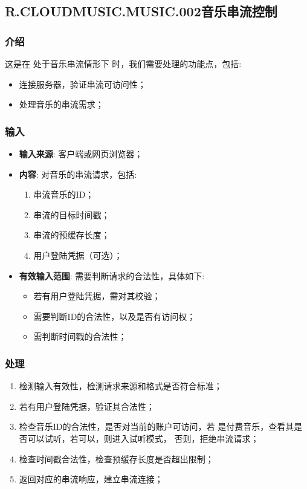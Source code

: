 \begin{enumerate}
\subsection{R.CLOUDMUSIC.MUSIC.002音乐串流控制}
\subsubsection{介绍}
	这是在 处于音乐串流情形下 时，我们需要处理的功能点，包括: 
	\begin{itemize}
		\item 连接服务器，验证串流可访问性；
		\item 处理音乐的串流需求；
	\end{itemize}
\subsubsection{输入}
	\begin{itemize}
		\item \textbf{输入来源}: 客户端或网页浏览器；
		\item \textbf{内容}: 对音乐的串流请求，包括: 
		\begin{enumerate}
			\item 串流音乐的ID；
			\item 串流的目标时间戳；
			\item 串流的预缓存长度；
			\item 用户登陆凭据（可选）；
		\end{enumerate}
		\item \textbf{有效输入范围}: 需要判断请求的合法性，具体如下: 
		\begin{itemize}
			\item 若有用户登陆凭据，需对其校验； 
			\item 需要判断ID的合法性，以及是否有访问权；
			\item 需判断时间戳的合法性； 
		\end{itemize}
	\end{itemize}
\subsubsection{处理}
	\begin{enumerate}
		\item 检测输入有效性，检测请求来源和格式是否符合标准；
		\item 若有用户登陆凭据，验证其合法性；
		\item 检查音乐ID的合法性，是否对当前的账户可访问，若
			是付费音乐，查看其是否可以试听，若可以，则进入试听模式，
			否则，拒绝串流请求；
		\item 检查时间戳合法性，检查预缓存长度是否超出限制；
		\item 返回对应的串流响应，建立串流连接；
	\end{enumerate}

\end{enumerate}
